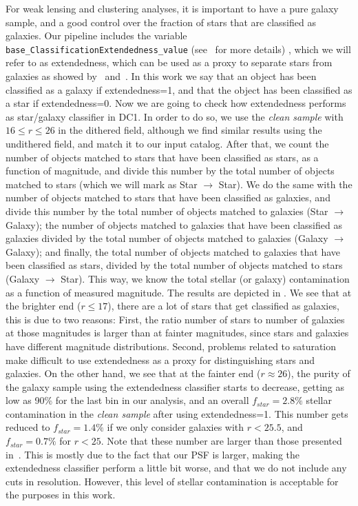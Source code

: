 \documentclass[twocolumn]{aastex62}
\begin{document}
For weak lensing and clustering analyses, it is important to have a pure galaxy sample, and a good control over the fraction of stars that are classified as galaxies. Our pipeline includes the variable \texttt{base\_ClassificationExtendedness\_value} (see~\citet{2018PASJ...70S...5B} for more details) , which we will refer to as extendedness, which can be used as a proxy to separate stars from galaxies as showed by~\citet{2018PASJ...70S..25M} and~\citet{2018PASJ...70S...5B}. In this work we say that an object has been classified as a galaxy if extendedness=1, and that the object has been classified as a star if extendedness=0. Now we are going to check how extendedness performs as star/galaxy classifier in DC1. In order to do so, we use the \textit{clean sample} with $16 \leq r \leq 26$ in the dithered field, although we find similar results using the undithered field, and match it to our input catalog. After that, we count the number of objects matched to stars that have been classified as stars, as a function of magnitude, and divide this number by the total number of objects matched to stars (which we will mark as Star $\rightarrow$ Star). We do the same with the number of objects matched to stars that have been classified as galaxies, and divide this number by the total number of objects matched to galaxies (Star $\rightarrow$ Galaxy); the number of objects matched to galaxies that have been classified as galaxies divided by the total number of objects matched to galaxies (Galaxy $\rightarrow$ Galaxy); and finally, the total number of objects matched to galaxies that have been classified as stars, divided by the total number of objects matched to stars (Galaxy $\rightarrow$ Star). This way, we know the total stellar (or galaxy) contamination as a function of measured magnitude. The results are depicted in . We see that at the brighter end ($r \leq 17$), there are a lot of stars that get classified as galaxies, this is due to two reasons: First, the ratio number of stars to number of galaxies at those magnitudes is larger than at fainter magnitudes, since stars and galaxies have different magnitude distributions. Second, problems related to saturation make difficult to use extendedness as a proxy for distinguishing stars and galaxies. On the other hand, we see that at the fainter end ($r \approx 26$), the purity of the galaxy sample using the extendedness classifier starts to decrease, getting as low as 90\% for the last bin in our analysis, and an overall $f_{star}=2.8\%$ stellar contamination in the \textit{clean sample} after using extendedness=1. This number gets reduced to $f_{star}=1.4\%$ if we only consider galaxies with $r < 25.5$, and $f_{star}=0.7\%$ for $r < 25$. Note that these number are larger than those presented in~\citet{2018PASJ...70S..25M}. This is mostly due to the fact that our PSF is larger, making the extendedness classifier perform a little bit worse, and that we do not include any cuts in resolution. However, this level of stellar contamination is acceptable for the purposes in this work.
\end{document}
